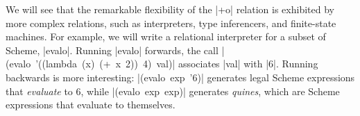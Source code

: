 We will see that the remarkable flexibility of the \scheme|+o|
relation is exhibited by more complex relations, such as interpreters,
type inferencers, and finite-state machines.
%
For example, we will write a relational interpreter for a subset
of Scheme, \scheme|evalo|. Running \scheme|evalo| forwards, the call
\mbox{\scheme|(evalo '((lambda (x) (+ x 2)) 4) val)|} associates
\scheme|val| with \schemeresult|6|. Running 
backwards is more interesting: \mbox{\scheme|(evalo exp '6)|} generates legal
Scheme expressions that \emph{evaluate} to 6, while
\mbox{\scheme|(evalo exp exp)|} generates \emph{quines}, which are Scheme expressions that evaluate to themselves.


%
%
%










